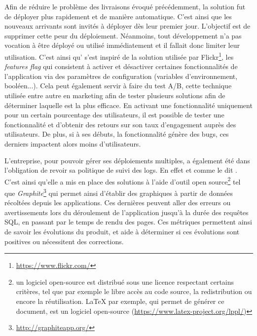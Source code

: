 Afin de réduire le problème des livraisons évoqué précédemment, la solution fut de déployer plus rapidement et de manière automatique. C'est ainsi que les nouveaux arrivants sont invités à déployer dès leur premier jour. L'objectif est de supprimer cette peur du déploiement. Néanmoins, tout développement n'a pas vocation à être déployé ou utilisé immédiatement et il fallait donc limiter leur utilisation. C'est ainsi qu'\etsy{} s'est inspiré de la solution utilisée par Flickr\footnote{\url{https://www.flickr.com/}}, les \emph{features flag} qui consistent à activer et désactiver certaines fonctionnalités de l'application via des paramètres de configuration (variables d'environnement, booléen...). Cela peut également servir à faire du test A/B, cette technique utilisée entre autre en marketing afin de tester plusieurs solutions afin de déterminer laquelle est la plus efficace. En activant une fonctionnalité uniquement pour un certain pourcentage des utilisateurs, il est possible de tester une fonctionnalité et d'obtenir des retours sur son taux d'engagement auprès des utilisateurs. De plus, si à ses débuts, la fonctionnalité génère des bugs, ces derniers impactent alors moins d'utilisateurs.

L'entreprise, pour pouvoir gérer ses déploiements multiples, a également été dans l'obligation de revoir sa politique de suivi des logs. En effet et comme \etsy{} le dit . C'est ainsi qu'elle a mis en place des solutions à l'aide d'outil open source\footnote{un logiciel open-source est distribué sous une licence respectant certains critères, tel que par exemple le libre accès au code source, la redistribution ou encore la réutilisation. \LaTeX{} par exemple, qui permet de générer ce document, est un logiciel open-source (\url{https://www.latex-project.org/lppl/})} tel que \emph{Graphite}\footnote{\url{http://graphiteapp.org/}} qui permet ainsi d'établir des graphiques à partir de données récoltées depuis les applications. Ces dernières peuvent aller des erreurs ou avertissements lors du déroulement de l'application jusqu'à la durée des requêtes \gls{SQL}, en passant par le temps de rendu des pages. Ces métriques permettent ainsi de savoir les évolutions du produit, et aide à déterminer si ces évolutions sont positives ou nécessitent des corrections.

